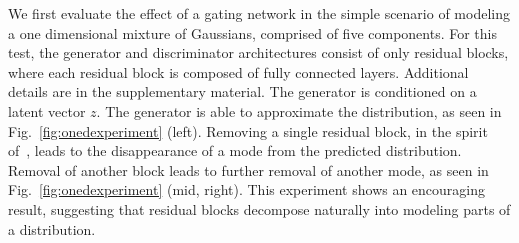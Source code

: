 We first evaluate the effect of a gating network in the simple scenario of modeling a one dimensional mixture of Gaussians, comprised of five components. For this test, the generator and discriminator architectures consist of only residual blocks, where each residual block is composed of fully connected layers. Additional details are in the supplementary material. The generator is conditioned on a latent vector $z$. The generator is able to approximate the distribution, as seen in Fig.~\ref{fig:onedexperiment} (left). Removing a single residual block, in the spirit of~\cite{veit2016residual}, leads to the disappearance of a mode from the predicted distribution. Removal of another block leads to further removal of another mode, as seen in Fig.~\ref{fig:onedexperiment}  (mid, right). This experiment shows an encouraging result, suggesting that residual blocks decompose naturally into modeling parts of a distribution.




